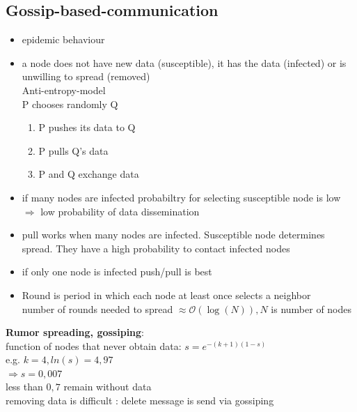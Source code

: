\documentclass[ngerman,a4paper]{report}
\begin{document}
\subsection{Gossip-based-communication}
\begin{itemize}
	\item epidemic behaviour
	\item a node does not have new data (susceptible), it has the data (infected) or is unwilling to spread (removed)\\
	Anti-entropy-model\\
	P chooses randomly Q\\
	\begin{enumerate}
		\item P pushes its data to Q
		\item P pulls Q's data
		\item P and Q exchange data
	\end{enumerate}
	\item if many nodes are infected probabiltry for selecting susceptible node  is low\\
	$\Rightarrow$ low probability of data dissemination\\
	\item pull works when many nodes are infected. Susceptible node determines spread. They have a high probability to contact infected nodes
	\item if only one node is infected push/pull is best
	\item Round is period in which each node at least once selects a neighbor\\
		number of rounds needed to spread  $\approx \mathcal{O}(\log(N)), N$ is number of nodes\\
\end{itemize}
\textbf{Rumor spreading, gossiping}:\\
function of nodes that never obtain data: $s=e^{-(k+1)(1-s)}$\\
e.g. $k=4, ln(s) = 4,97$\\
$\Rightarrow s = 0,007$\\
less than $0,7$ remain without data\\
removing data is difficult : delete message is send via gossiping
\end{document}
